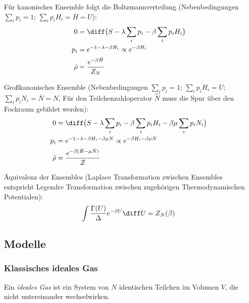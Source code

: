 \documentclass[11pt]{article}
\numberwithin{equation}{section}
\begin{document}
        Für kanonisches Ensemble folgt die Boltzmannverteilung (Nebenbedingungen $\sum_i p_i = 1$; $\sum_i p_i H_i = \overline{H} = U$):
        \begin{equation}
          \begin{aligned}
            0 &= \diff \big( S - \lambda \sum_i p_i - \beta \sum_i p_i H_i \big) \\
            p_i &= e^{-1-\lambda-\beta H_i} \propto e^{-\beta H_i} \\
            \hat{\rho} &= \frac{e^{-\beta \hat{H}}}{Z_N} \\
          \end{aligned}
        \end{equation}

        Großkanonisches Ensemble (Nebenbedingungen $\sum_i p_i = 1$; $\sum_i p_i H_i = U$; $\sum_i p_i N_i = \overline{N} = N$, Für den Teilchenzahloperator $\hat{N}$ muss die Spur über den Fockraum gebildet werden):
        \begin{equation}
          \begin{aligned}
            0 &= \diff \big( S - \lambda \sum_i p_i - \beta \sum_i p_i H_i - \beta\mu \sum_i p_i N_i \big) \\
            p_i &= e^{-1-\lambda-\beta H_i-\beta\mu N} \propto e^{-\beta H_i - \beta\mu N} \\
            \hat{\rho} &= \frac{e^{-\beta (\hat{H} - \mu \hat{N})}}{\mathcal{Z}} \\
          \end{aligned}
        \end{equation}

        Äquivalenz der Ensembles (Laplace Transformation zwischen Ensembles entspricht Legendre Transformation zwischen zugehörigen Thermodynamischen Potentialen):
        \begin{equation}
          \int \frac{\Gamma(U)}{\Delta} e^{-\beta U} \diff U = Z_N(\beta)
        \end{equation}



    \subsection{Modelle}
      \subsubsection{Klassisches ideales Gas}
        Ein \emph{ideales Gas} ist ein System von $N$ identischen Teilchen im Volumen $V$, die nicht untereinander wechselwirken. \\
\end{document}
